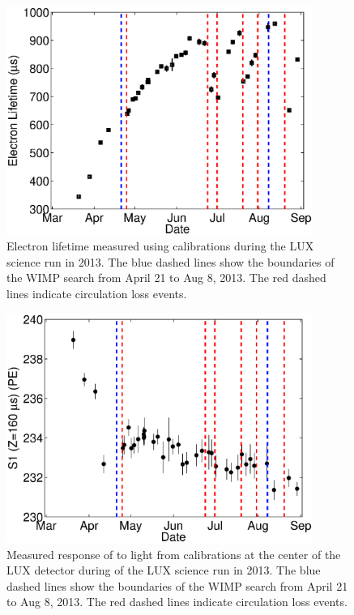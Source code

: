 \begin{figure}[h!]\centering
\includegraphics[width=100mm]{Chapter_XYZ_Corr/Thesis_Corr_Plots/lifetime_fig_3.eps}
\caption{Electron lifetime measured using \KrCal calibrations during the LUX science run in 2013. The blue dashed lines show the boundaries of the WIMP search from April 21 to Aug 8, 2013. The red dashed lines indicate circulation loss events.}
\label{fig:S2_EL_time}
\end{figure}

\begin{figure}[h!]\centering
\includegraphics[width=100mm]{Chapter_XYZ_Corr/Thesis_Corr_Plots/s1_center_fig_3.eps}
\caption{Measured response of to light from \KrCal calibrations at the center of the LUX detector during of the LUX science run in 2013. The blue dashed lines show the boundaries of the WIMP search from April 21 to Aug 8, 2013. The red dashed lines indicate circulation loss events.}
\label{fig:S1_center_time}
\end{figure}





